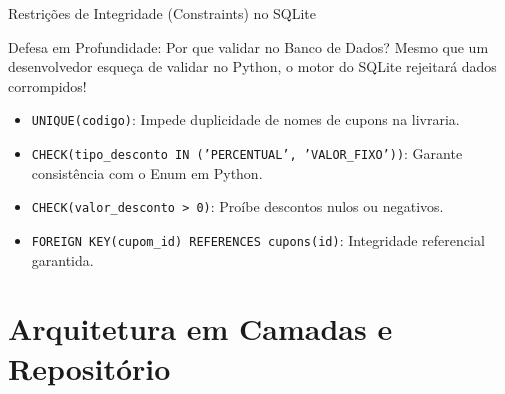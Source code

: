 \documentclass[10pt]{beamer}
\begin{document}
\begin{frame}{Restrições de Integridade (Constraints) no SQLite}
    \begin{block}{Defesa em Profundidade: Por que validar no Banco de Dados?}
    Mesmo que um desenvolvedor esqueça de validar no Python, o motor do SQLite rejeitará dados corrompidos!
    \end{block}
    \vspace{0.2cm}
    \begin{itemize}
        \item \texttt{UNIQUE(codigo)}: Impede duplicidade de nomes de cupons na livraria.
        \item \texttt{CHECK(tipo\_desconto IN ('PERCENTUAL', 'VALOR\_FIXO'))}: Garante consistência com o Enum em Python.
        \item \texttt{CHECK(valor\_desconto > 0)}: Proíbe descontos nulos ou negativos.
        \item \texttt{FOREIGN KEY(cupom\_id) REFERENCES cupons(id)}: Integridade referencial garantida.
    \end{itemize}
\end{frame}

\section{Arquitetura em Camadas e Repositório}
\end{document}
